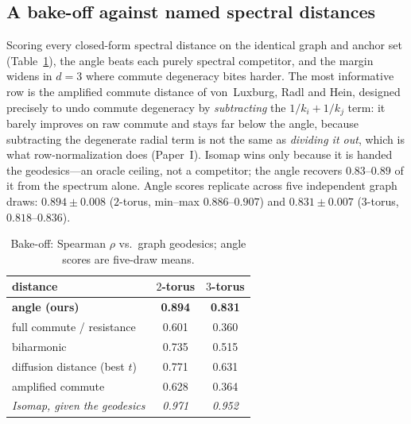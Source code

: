 \documentclass[11pt]{article}
\begin{document}
\subsection{A bake-off against named spectral distances}\label{sec:bakeoff}
Scoring every closed-form spectral distance on the identical graph and anchor set
(Table~\ref{tab:bakeoff}), the angle beats each purely spectral competitor, and the
margin widens in $d{=}3$ where commute degeneracy bites harder. The most informative row
is the amplified commute distance of von~Luxburg, Radl and Hein, designed precisely to
undo commute degeneracy by \emph{subtracting} the $1/k_i+1/k_j$ term: it barely improves
on raw commute and stays far below the angle, because subtracting the degenerate radial
term is not the same as \emph{dividing it out}, which is what row-normalization does
(Paper~I). Isomap wins only because it is handed the geodesics---an oracle ceiling, not a
competitor; the angle recovers $0.83$--$0.89$ of it from the spectrum alone. Angle scores
replicate across five independent graph draws: $0.894\pm0.008$ ($2$-torus, min--max
$0.886$--$0.907$) and $0.831\pm0.007$ ($3$-torus, $0.818$--$0.836$).

\begin{table}[h]\centering
\caption{Bake-off: Spearman $\rho$ vs.\ graph geodesics; angle scores are five-draw means.}
\label{tab:bakeoff}
\begin{tabular}{@{}lcc@{}}
\toprule
distance & $2$-torus & $3$-torus \\
\midrule
\textbf{angle (ours)}                       & \textbf{0.894} & \textbf{0.831} \\
full commute / resistance                   & 0.601 & 0.360 \\
biharmonic                                  & 0.735 & 0.515 \\
diffusion distance (best $t$)               & 0.771 & 0.631 \\
amplified commute                           & 0.628 & 0.364 \\
\midrule
\textit{Isomap, given the geodesics}        & \textit{0.971} & \textit{0.952} \\
\bottomrule
\end{tabular}
\end{table}
\end{document}
